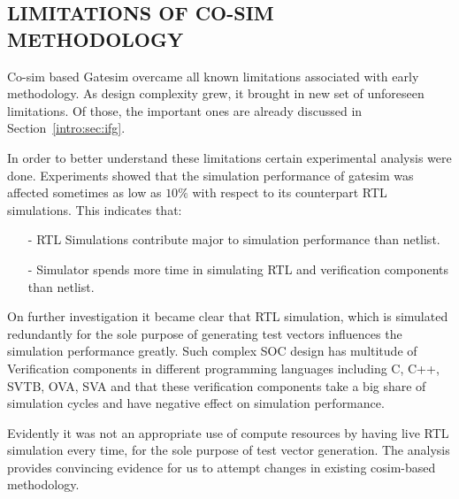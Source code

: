 \subsection {LIMITATIONS OF CO-SIM METHODOLOGY}

Co-sim based Gatesim overcame all known limitations associated with early methodology. As design complexity grew, it brought in new set of unforeseen limitations. Of those, the important ones are already discussed in Section~\ref{intro:sec:ifg}.

In order to better understand these limitations certain experimental analysis were done. Experiments showed that the simulation performance of gatesim was affected sometimes as low as $10\%$ with respect to its counterpart RTL simulations. This indicates that:

\begin{itemize}
	\item[-]RTL Simulations contribute major to simulation performance than netlist.
	\item[-]Simulator spends more time in simulating RTL and verification components than netlist.
\end{itemize}

On further investigation it became clear that RTL simulation, which is simulated redundantly for the sole purpose of generating test vectors influences the simulation performance greatly. Such complex SOC design has multitude of Verification components in different programming languages including C, C++, SVTB, OVA, SVA and that these verification components take a big share of simulation cycles and have negative effect on simulation performance.

Evidently it was not an appropriate use of compute resources by having live RTL simulation every time, for the sole purpose of test vector generation. The analysis provides convincing evidence for us to attempt changes in existing cosim-based methodology.


